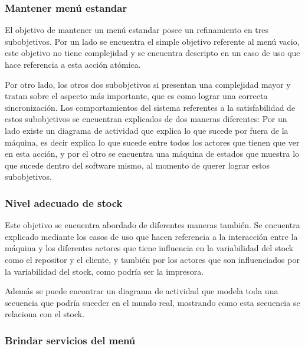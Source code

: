 \documentclass[a4paper,10pt]{article}
\begin{document}
 
\subsubsection*{Mantener men\'u estandar}

El objetivo de mantener un men\'u estandar posee un refinamiento en tres subobjetivos. Por un lado se encuentra el simple objetivo referente
al men\'u vacio, este objetivo no tiene complejidad y se encuentra descripto en un caso de uso que hace referencia a esta acci\'on at\'omica.

Por otro lado, los otros dos subobjetivos si presentan una complejidad mayor y tratan sobre el aspecto m\'as importante, que es como lograr una 
correcta sincronizaci\'on. Los comportamientos del sistema referentes a la satisfabilidad de estos subobjetivos se encuentran explicados de dos maneras
diferentes: Por un lado existe un diagrama de actividad que explica lo que sucede por fuera de la m\'aquina, es decir explica lo que sucede entre todos
los actores que tienen que ver en esta acci\'on, y por el otro se encuentra una m\'aquina de estados que muestra lo que sucede dentro del software
mismo, al momento de querer lograr estos subobjetivos.

\subsubsection*{Nivel adecuado de stock}

Este objetivo se encuentra abordado de diferentes maneras tambi\'en. Se encuentra explicado mediante los casos de uso que hacen referencia a la 
interacci\'on entre la m\'aquina y los diferentes actores que tiene influencia en la variabilidad del stock como el repositor y el cliente, y 
tambi\'en por los actores que son influenciados por la variabilidad del stock, como podr\'ia ser la impresora.

Adem\'as se puede encontrar un diagrama de actividad que modela toda una secuencia que podr\'ia suceder en el mundo real, mostrando como 
esta secuencia se relaciona con el stock.

\subsubsection*{Brindar servicios del men\'u}
\end{document}
